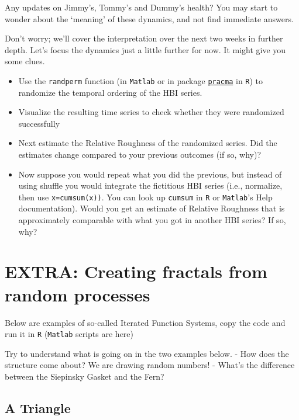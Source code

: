 \documentclass[]{book}
\let\stdsection\section
\renewcommand\section{\newpage\stdsection}
\begin{document}
Any updates on Jimmy's, Tommy's and Dummy's health? You may start to
wonder about the `meaning' of these dynamics, and not find immediate
answers.

Don't worry; we'll cover the interpretation over the next two weeks in
further depth. Let's focus the dynamics just a little further for now.
It might give you some clues.

\begin{itemize}
\item
  Use the \texttt{randperm} function (in \texttt{Matlab} or in package
  \href{http://www.inside-r.org/packages/cran/pracma}{\texttt{pracma}}
  in \texttt{R}) to randomize the temporal ordering of the HBI series.
\item
  Visualize the resulting time series to check whether they were
  randomized successfully
\item
  Next estimate the Relative Roughness of the randomized series. Did the
  estimates change compared to your previous outcomes (if so, why)?
\item
  Now suppose you would repeat what you did the previous, but instead of
  using shuffle you would integrate the fictitious HBI series (i.e.,
  normalize, then use \texttt{x=cumsum(x))}. You can look up
  \texttt{cumsum} in \texttt{R} or \texttt{Matlab}'s Help
  documentation). Would you get an estimate of Relative Roughness that
  is approximately comparable with what you got in another HBI series?
  If so, why?
\end{itemize}

\section{EXTRA: Creating fractals from random
processes}\label{extra-creating-fractals-from-random-processes}

Below are examples of so-called Iterated Function Systems, copy the code
and run it in \texttt{R} (\texttt{Matlab} scripts are here)

Try to understand what is going on in the two examples below. - How does
the structure come about? We are drawing random numbers! - What's the
difference between the Siepinsky Gasket and the Fern?

\subsection{A Triangle}\label{a-triangle}
\end{document}
